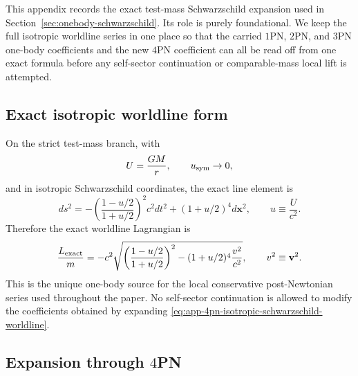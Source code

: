 \documentclass[11pt]{article}
\begin{document}
This appendix records the exact test-mass Schwarzschild expansion used in
Section~\ref{sec:onebody-schwarzschild}.  Its role is purely foundational.  We
keep the full isotropic worldline series in one place so that the carried
$1$PN, $2$PN, and $3$PN one-body coefficients and the new $4$PN coefficient can
all be read off from one exact formula before any self-sector continuation or
comparable-mass local lift is attempted.

\subsection{Exact isotropic worldline form}
\label{app:onebody-expansion-exact}

On the strict test-mass branch, with
\[
U=\frac{GM}{r},
\qquad
u_{\rm sym}\to 0,
\]
and in isotropic Schwarzschild coordinates, the exact line element is
\begin{equation}
 ds^2
 =
 -\left(\frac{1-u/2}{1+u/2}\right)^2 c^2 dt^2
 +(1+u/2)^4 d\mathbf{x}^2,
 \qquad
 u\equiv \frac{U}{c^2}.
\label{eq:app-4pn-isotropic-schwarzschild-metric}
\end{equation}
Therefore the exact worldline Lagrangian is
\begin{equation}
\frac{L_{\rm exact}}{m}
=
-c^2\sqrt{\left(\frac{1-u/2}{1+u/2}\right)^2-(1+u/2)^4\frac{v^2}{c^2}},
\qquad
v^2\equiv \mathbf v^2.
\label{eq:app-4pn-isotropic-schwarzschild-worldline}
\end{equation}
This is the unique one-body source for the local conservative post-Newtonian
series used throughout the paper.  No self-sector continuation is allowed to
modify the coefficients obtained by expanding
\eqref{eq:app-4pn-isotropic-schwarzschild-worldline}.

\subsection{Expansion through \texorpdfstring{$4$}{4}PN}
\label{app:onebody-expansion-series}
\end{document}
